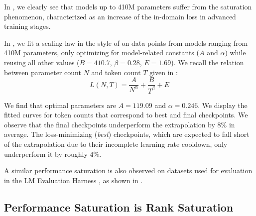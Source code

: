 In , we clearly see that models up to 410M parameters suffer from the saturation phenomenon, characterized as an increase of the in-domain loss in advanced training stages. 

In , we fit a scaling law in the style of \citet{chinchilla_scaling} on data points from models ranging from 410M parameters, only optimizing for model-related constants ($A$ and $\alpha$) while reusing all other values ($B=410.7$, $\beta=0.28$, $E=1.69$). We recall the relation between parameter count $N$ and token count $T$ given in \citet{chinchilla_scaling}:
$$
L(N, T) = \frac{A}{N^\alpha} + \frac{B}{T^\beta} + E
$$

We find that optimal parameters are $A=119.09$ and $\alpha=0.246$. We display the fitted curves for token counts that correspond to best and final checkpoints. We observe that the final checkpoints underperform the extrapolation by 8\% in average. The loss-minimizing (\textit{best}) checkpoints, which are expected to fall short of the extrapolation due to their incomplete learning rate cooldown, only underperform it by roughly 4\%.

A similar performance saturation is also observed on datasets used for evaluation in the LM Evaluation Harness \citep{eval-harness}, as shown in .

\begin{table}[h]
\centering
{}
\caption{Zero-shot performance of Pythia-160M best and final checkpoints on evaluation datasets. Unless specified, we report accuracy for all tasks.}
\label{tab:perf_gap}
\end{table}


\subsection{Performance Saturation is Rank Saturation}
